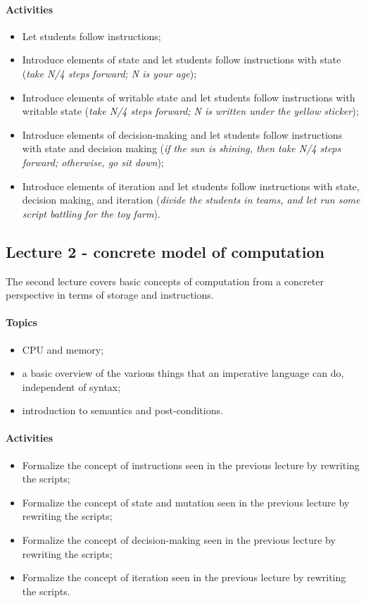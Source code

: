 		\paragraph*{Activities}
			\begin{itemize}
				\item Let students follow instructions;
				\item Introduce elements of state and let students follow instructions with state (\textit{take N/4 steps forward; N is your age});
				\item Introduce elements of writable state and let students follow instructions with writable state (\textit{take N/4 steps forward; N is written under the yellow sticker});
				\item Introduce elements of decision-making and let students follow instructions with state and decision making (\textit{if the sun is shining, then take N/4 steps forward; otherwise, go sit down});
				\item Introduce elements of iteration and let students follow instructions with state, decision making, and iteration (\textit{divide the students in teams, and let run some script battling for the toy farm}).
			\end{itemize}

			\subsection{Lecture 2 - concrete model of computation}
				The second lecture covers basic concepts of computation from a concreter perspective in terms of storage and instructions.

				\paragraph*{Topics}
					\begin{itemize}
						\item CPU and memory;
						\item a basic overview of the various things that an imperative language can do, independent of syntax;
						\item introduction to semantics and post-conditions.
					\end{itemize}

				\paragraph*{Activities}
					\begin{itemize}
						\item Formalize the concept of instructions seen in the previous lecture by rewriting the scripts;
						\item Formalize the concept of state and mutation seen in the previous lecture by rewriting the scripts;
						\item Formalize the concept of decision-making seen in the previous lecture by rewriting the scripts;
						\item Formalize the concept of iteration seen in the previous lecture by rewriting the scripts.
					\end{itemize}


